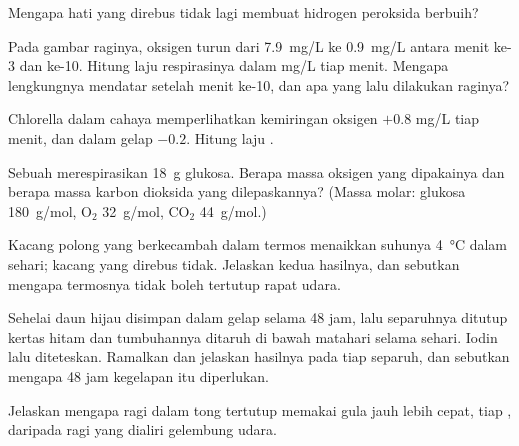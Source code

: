 \begin{exercise}[$\star$]\label{exo:g10:cell-metabolism:5}
Mengapa hati yang direbus tidak lagi membuat hidrogen peroksida berbuih?
\end{exercise}

\begin{exercise}[$\star\star$]\label{exo:g10:cell-metabolism:6}
Pada gambar raginya, oksigen turun dari \qty{7.9}{mg/L} ke
\qty{0.9}{mg/L} antara menit ke-3 dan ke-10. Hitung laju respirasinya
dalam \unit{mg/L} tiap menit. Mengapa lengkungnya mendatar setelah
menit ke-10, dan apa yang lalu dilakukan raginya?
\end{exercise}

\begin{exercise}[$\star\star$]\label{exo:g10:cell-metabolism:7}
Chlorella dalam cahaya memperlihatkan kemiringan oksigen $+0.8$ \unit{mg/L}
tiap menit, dan dalam gelap $-0.2$. Hitung laju .
\end{exercise}

\begin{exercise}[$\star\star$]\label{exo:g10:cell-metabolism:8}
Sebuah  merespirasikan \qty{18}{g} glukosa. Berapa massa oksigen
yang dipakainya dan berapa massa karbon dioksida yang dilepaskannya?
(Massa molar: glukosa \qty{180}{g/mol}, $\mathrm{O_2}$ \qty{32}{g/mol},
$\mathrm{CO_2}$ \qty{44}{g/mol}.)
\end{exercise}

\begin{exercise}[$\star\star$]\label{exo:g10:cell-metabolism:9}
Kacang polong yang berkecambah dalam termos menaikkan suhunya
\qty{4}{\celsius} dalam sehari; kacang yang direbus tidak. Jelaskan
kedua hasilnya, dan sebutkan mengapa termosnya tidak boleh tertutup rapat udara.
\end{exercise}

\begin{exercise}[$\star\star$]\label{exo:g10:cell-metabolism:10}
Sehelai daun hijau disimpan dalam gelap selama 48 jam, lalu separuhnya
ditutup kertas hitam dan tumbuhannya ditaruh di bawah matahari selama
sehari. Iodin lalu diteteskan. Ramalkan dan jelaskan hasilnya pada tiap
separuh, dan sebutkan mengapa 48 jam kegelapan itu diperlukan.
\end{exercise}

\begin{exercise}[$\star\star$]\label{exo:g10:cell-metabolism:11}
Jelaskan mengapa ragi dalam tong tertutup memakai gula jauh lebih
cepat, tiap , daripada ragi yang dialiri gelembung udara.
\end{exercise}


